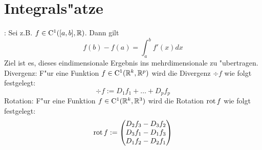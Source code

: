 \section{Integrals"atze}
\example:{
  Sei z.B. $f\in{\rm C}^1([a,b],\mathbb R)$. Dann gilt
  \[f(b)-f(a)=\int_a^b f'(x)dx
    \]
  Ziel ist es, dieses eindimensionale Ergebnis ins mehrdimensionale 
  zu "ubertragen.
  }
 Divergenz:{
  F"ur eine Funktion $f\in{\rm C}^1(\mathbb R^k,\mathbb R^p)$ wird die Divergenz 
  $\div f$ wie folgt festgelegt:
  \[\div f:=D_1f_1+\ldots+D_pf_p
    \]
  }
 Rotation:{
  F"ur eine Funktion $f\in{\rm C}^1(\mathbb R^k,\mathbb R^3)$ wird die Rotation
  $\operatorname{rot} f$ wie folgt festgelegt:
  \[\operatorname{rot} f:=\begin{pmatrix}
      D_2f_3-D_3f_2 \\
      D_3f_1-D_1f_3 \\
      D_1f_2-D_2f_1
      \end{pmatrix}
    \]
  }
